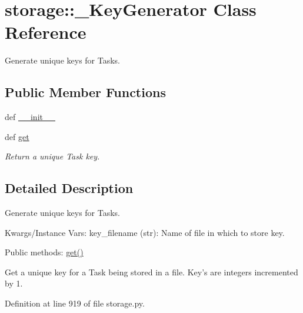 \hypertarget{classstorage_1_1__KeyGenerator}{
\section{storage\-:\-:\-\_\-\-Key\-Generator \-Class \-Reference}
\label{classstorage_1_1__KeyGenerator}
}


\-Generate unique keys for \-Tasks.  


\subsection*{\-Public \-Member \-Functions}
\begin{DoxyCompactItemize}
\item 
def \hyperlink{classstorage_1_1__KeyGenerator_a30be863b3750c5c64f70cf5248077d00}{\-\_\-\-\_\-init\-\_\-\-\_\-}
\item 
def \hyperlink{classstorage_1_1__KeyGenerator_a8af8da73137b1d6baf04cbf007b61eda}{get}
\begin{DoxyCompactList}\small\item\em \-Return a unique \-Task key. \end{DoxyCompactList}\end{DoxyCompactItemize}


\subsection{\-Detailed \-Description}
\-Generate unique keys for \-Tasks. 

\-Kwargs/\-Instance \-Vars\-: key\-\_\-filename (str)\-: \-Name of file in which to store key.

\-Public methods\-: \hyperlink{classstorage_1_1__KeyGenerator_a8af8da73137b1d6baf04cbf007b61eda}{get()}

\-Get a unique key for a \-Task being stored in a file. \-Key's are integers incremented by 1. 

\-Definition at line 919 of file storage.\-py.



